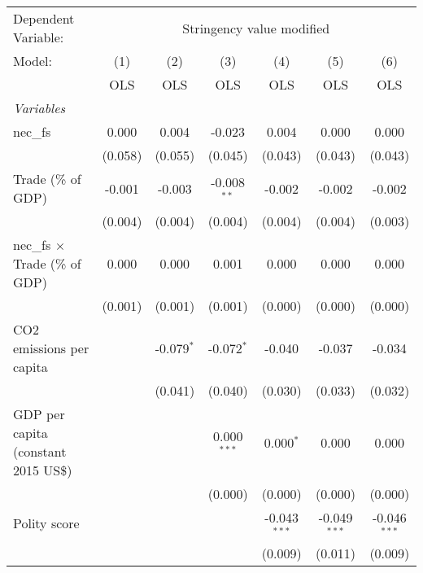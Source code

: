 
\begingroup
\centering
\begin{tabular}{lcccccc}
   \toprule
   Dependent Variable: & \multicolumn{6}{c}{Stringency value modified}\\
   Model:                                & (1)     & (2)          & (3)           & (4)            & (5)            & (6)\\  
                                         &  OLS    & OLS          & OLS           & OLS            & OLS            & OLS\\  
   \midrule
   \emph{Variables}\\
   nec\_fs                               & 0.000   & 0.004        & -0.023        & 0.004          & 0.000          & 0.000\\   
                                         & (0.058) & (0.055)      & (0.045)       & (0.043)        & (0.043)        & (0.043)\\   
   Trade (\% of GDP)                     & -0.001  & -0.003       & -0.008$^{**}$ & -0.002         & -0.002         & -0.002\\   
                                         & (0.004) & (0.004)      & (0.004)       & (0.004)        & (0.004)        & (0.003)\\   
   nec\_fs $\times$ Trade (\% of GDP)    & 0.000   & 0.000        & 0.001         & 0.000          & 0.000          & 0.000\\   
                                         & (0.001) & (0.001)      & (0.001)       & (0.000)        & (0.000)        & (0.000)\\   
   CO2 emissions per capita              &         & -0.079$^{*}$ & -0.072$^{*}$  & -0.040         & -0.037         & -0.034\\   
                                         &         & (0.041)      & (0.040)       & (0.030)        & (0.033)        & (0.032)\\   
   GDP per capita (constant 2015 US\$)   &         &              & 0.000$^{***}$ & 0.000$^{*}$    & 0.000          & 0.000\\   
                                         &         &              & (0.000)       & (0.000)        & (0.000)        & (0.000)\\   
   Polity score                          &         &              &               & -0.043$^{***}$ & -0.049$^{***}$ & -0.046$^{***}$\\   
                                         &         &              &               & (0.009)        & (0.011)        & (0.009)\\   

\end{tabular}
